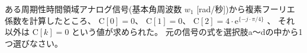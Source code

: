 ある周期性時間領域アナログ信号(基本角周波数  $w_1$ [rad/秒])から複素フーリエ係数を計算したところ、
$\textrm{C}[0] = 0$、
$\textrm{C}[1] = 0$、
$\textrm{C}[2] = 4 \cdot \textrm{e}^{\{ -j \cdot \pi/4 \}}$ 、
それ以外は $\textrm{C}[k] = 0$ という値が求められた。
元の信号の式を選択肢a〜dの中から1つ選びなさい。

